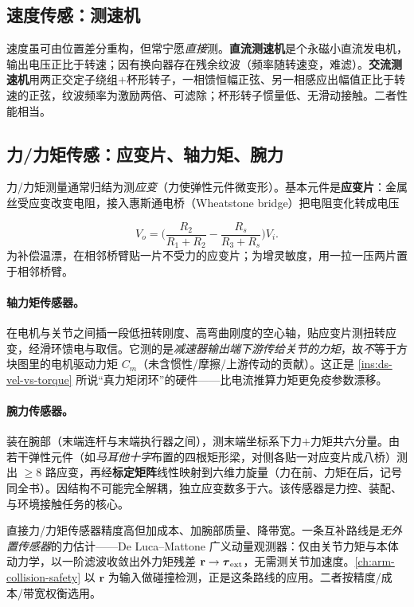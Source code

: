 \subsection{速度传感：测速机}
\label{sec:ds-tacho}

速度虽可由位置差分重构，但常宁愿\emph{直接}测。\textbf{直流测速机}是个永磁小直流发电机，输出电压正比于转速；因有换向器存在残余纹波（频率随转速变，难滤）。\textbf{交流测速机}用两正交定子绕组$+$杯形转子，一相馈恒幅正弦、另一相感应出幅值正比于转速的正弦，纹波频率为激励两倍、可滤除；杯形转子惯量低、无滑动接触。二者性能相当。

\subsection{力/力矩传感：应变片、轴力矩、腕力}
\label{sec:ds-force}

力/力矩测量通常归结为测\emph{应变}（力使弹性元件微变形）。基本元件是\textbf{应变片}：金属丝受应变改变电阻，接入惠斯通电桥（Wheatstone bridge）把电阻变化转成电压

\begin{equation}
V_o=\Big(\frac{R_2}{R_1+R_2}-\frac{R_s}{R_3+R_s}\Big)V_i.
\label{eq:ds-bridge}
\end{equation}
为补偿温漂，在相邻桥臂贴一片不受力的应变片；为增灵敏度，用一拉一压两片置于相邻桥臂。

\paragraph{轴力矩传感器。}\;在电机与关节之间插一段低扭转刚度、高弯曲刚度的空心轴，贴应变片测扭转应变，经滑环馈电与取信。它测的是\emph{减速器输出端\emph{下游}传给关节的力矩}，故\emph{不}等于方块图里的电机驱动力矩 $C_m$（未含惯性/摩擦/上游传动的贡献）。这正是 \cref{ins:ds-vel-vs-torque} 所说“真力矩闭环”的硬件——比电流推算力矩更免疫参数漂移。

\paragraph{腕力传感器。}\;装在腕部（末端连杆与末端执行器之间），测末端坐标系下力$+$力矩共六分量。由若干弹性元件（如\emph{马耳他十字}布置的四根矩形梁，对侧各贴一对应变片成八桥）测出 $\ge8$ 路应变，再经\textbf{标定矩阵}线性映射到六维力旋量（力在前、力矩在后，记号同全书）。因结构不可能完全解耦，独立应变数多于六。该传感器是力控、装配、与环境接触任务的核心。

\begin{note}
直接力/力矩传感器精度高但加成本、加腕部质量、降带宽。一条互补路线是\emph{无外置传感器}的力估计——De Luca--Mattone 广义动量观测器\cite{deluca2003actuator}：仅由关节力矩与本体动力学，以一阶滤波收敛出外力矩残差 $\mathbf r\to\boldsymbol\tau_{\rm ext}$，无需测关节加速度。\cref{ch:arm-collision-safety} 以 $\mathbf r$ 为输入做碰撞检测，正是这条路线的应用。二者按精度/成本/带宽权衡选用。
\end{note}

